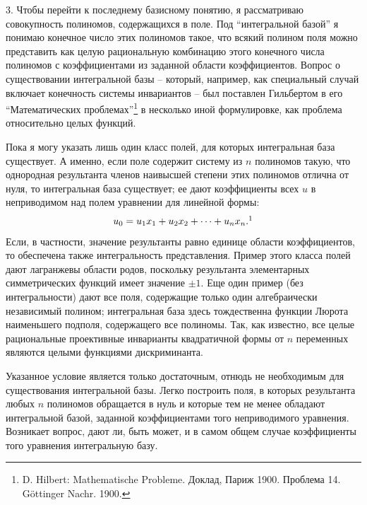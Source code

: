 \documentclass[11pt]{article}
\begin{document}
3. Чтобы перейти к последнему базисному понятию, я рассматриваю совокупность полиномов, содержащихся в поле. Под ``интегральной базой'' я понимаю конечное число этих полиномов такое, что всякий полином поля можно представить как целую рациональную комбинацию этого конечного числа полиномов с коэффициентами из заданной области коэффициентов. Вопрос о существовании интегральной базы -- который, например, как специальный случай включает конечность системы инвариантов -- был поставлен Гильбертом в его ``Математических проблемах''\footnote{D. Hilbert: Mathematische Probleme. Доклад, Париж 1900. Проблема 14. Göttinger Nachr. 1900.} в несколько иной формулировке, как проблема относительно целых функций.

Пока я могу указать лишь один класс полей, для которых интегральная база существует. А именно, если поле содержит систему из $n$ полиномов такую, что однородная результанта членов наивысшей степени этих полиномов отлична от нуля, то интегральная база существует; ее дают коэффициенты всех $u$ в неприводимом над полем уравнении для линейной формы:
\[
  u_0=u_1x_1+u_2x_2+\cdots+u_nx_n.\footnotemark
\]
Если, в частности, значение результанты равно единице области коэффициентов, то обеспечена также интегральность представления. Пример этого класса полей дают лагранжевы области родов, поскольку результанта элементарных симметрических функций имеет значение $\pm 1$. Еще один пример (без интегральности) дают все поля, содержащие только один алгебраически независимый полином; интегральная база здесь тождественна функции Люрота наименьшего подполя, содержащего все полиномы. Так, как известно, все целые рациональные проективные инварианты квадратичной формы от $n$ переменных являются целыми функциями дискриминанта.

\enlargethispage{2\baselineskip}
Указанное условие является только достаточным, отнюдь не необходимым для существования интегральной базы. Легко построить поля, в которых результанта любых $n$ полиномов обращается в нуль и которые тем не менее обладают интегральной базой, заданной коэффициентами того неприводимого уравнения. Возникает вопрос, дают ли, быть может, и в самом общем случае коэффициенты того уравнения интегральную базу.
\end{document}
